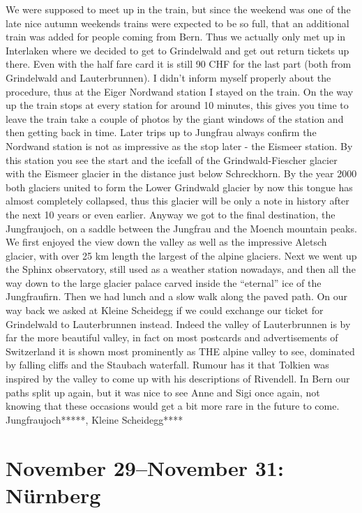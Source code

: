 We were supposed to meet up in the train, but since the weekend was one of the late nice autumn weekends trains were expected to be so full, that an additional train was added for people coming from Bern. Thus we actually only met up in Interlaken where we decided to get to Grindelwald and get out return tickets up there. Even with the half fare card it is still 90 CHF for the last part (both from Grindelwald and Lauterbrunnen). I didn't inform myself properly about the procedure, thus at the Eiger Nordwand station I stayed on the train. On the way up the train stops at every station for around 10 minutes, this gives you time to leave the train take a couple of photos by the giant windows of the station and then getting back in time. Later trips up to Jungfrau always confirm the Nordwand station is not as impressive as the stop later - the Eismeer station. By this station you see the start and the icefall of the Grindwald-Fiescher glacier with the Eismeer glacier in the distance just below Schreckhorn. By the year 2000 both glaciers united to form the Lower Grindwald glacier by now this tongue has almost completely collapsed, thus this glacier will be only a note in history after the next 10 years or even earlier. Anyway we got to the final destination, the Jungfraujoch, on a saddle between the Jungfrau and the Moench mountain peaks. We first enjoyed the view down the valley as well as the impressive Aletsch glacier, with over 25 km length the largest of the alpine glaciers. Next we went up the Sphinx observatory, still used as a weather station nowadays, and then all the way down to the large glacier palace carved inside the ``eternal'' ice of the Jungfraufirn. Then we had lunch and a slow walk along the paved path. On our way back we asked at Kleine Scheidegg if we could exchange our ticket for Grindelwald to Lauterbrunnen instead. Indeed the valley of Lauterbrunnen is by far the more beautiful valley, in fact on most postcards and advertisements of Switzerland it is shown most prominently as THE alpine valley to see, dominated by falling cliffs and the Staubach waterfall. Rumour has it that Tolkien was inspired by the valley to come up with his descriptions of Rivendell. In Bern our paths split up again, but it was nice to see Anne and Sigi once again, not knowing that these occasions would get a bit more rare in the future to come.\\

Jungfraujoch*****, Kleine Scheidegg****

\section{November 29--November 31: N\"urnberg}
\label{2008:Nuernberg}

